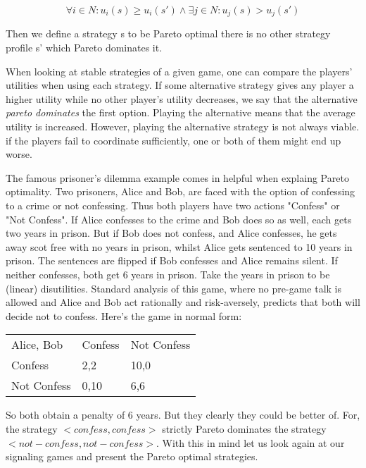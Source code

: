 \documentclass[10]{article}
\begin{document}
\begin{equation*}
\forall i \in N: u_i(s) \geq u_i(s') \land \exists j \in N: u_j(s) > u_j(s')
\end{equation*}

Then we define a strategy s to be Pareto optimal there is no other strategy profile s' which Pareto dominates it. %


When looking at stable strategies of a given game, one can compare the players' utilities when using each strategy. If some alternative strategy gives any player a higher utility while no other player's utility decreases, we say that the alternative \textit{pareto dominates} the first option. Playing the alternative means that the average utility is increased. However, playing the alternative strategy is not always viable. if the players fail to coordinate sufficiently, one or both of them might end up worse. 

The famous prisoner's dilemma example comes in helpful when explaing Pareto optimality. Two prisoners, Alice and Bob, are faced with the option of confessing to a crime or not confessing. Thus both players have two actions "Confess" or "Not Confess". If Alice confesses to the crime and Bob does so as well, each gets two years in prison. But if Bob does not confess, and Alice confesses, he gets away scot free with no years in prison, whilst Alice gets sentenced to 10 years in prison. The sentences are flipped if Bob  confesses and Alice remains silent. If neither confesses, both get 6 years in prison. Take the years in prison to be (linear) disutilities. Standard analysis of this game, where no pre-game talk is allowed and Alice and Bob act rationally and risk-aversely, predicts that both will decide not to confess. Here's the game in normal form:
\begin{table}[h]
\centering
\begin{tabular}{lll}
Alice, Bob   & Confess & Not Confess \\
Confess           & 2,2     & 10,0    \\
Not Confess        & 0,10    & 6,6
\end{tabular}
\end{table}
So both obtain a penalty of 6 years. But they clearly they could be better of. For, the strategy $<confess, confess>$ strictly Pareto dominates the strategy $<not-confess,not-confess>$.
With this in mind let us look again at our signaling games and present the Pareto optimal strategies.
\end{document}
